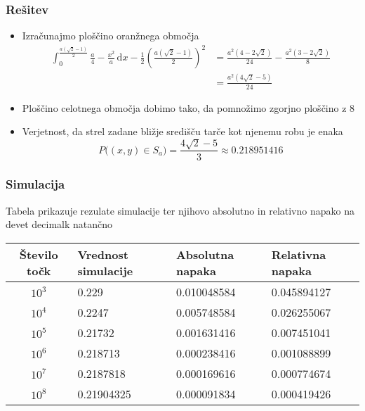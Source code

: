 \documentclass{beamer}
\begin{document}
\begin{frame}
    \frametitle{Rešitev}
\begin{itemize}
\item Izračunajmo ploščino oranžnega območja
\begin{align*}
    \int_{0}^{\frac{a(\sqrt{2}-1)}{2}} \frac{a}{4} - \frac{x^2}{a} \, \mathrm{d}x - \frac{1}{2}(\frac{a(\sqrt{2}-1)}{2})^2
    &= \frac{a^2(4-2\sqrt{2})}{24} - \frac{a^2(3-2\sqrt{2})}{8} \\
    &= \frac{a^2(4\sqrt{2}-5)}{24}
\end{align*}
\item Ploščino celotnega območja dobimo tako, da pomnožimo zgorjno ploščino z $8$
\item Verjetnost, da strel zadane bližje središču tarče kot njenemu robu je enaka
\begin{equation*}
    P\big((x,y) \in S_a\big) = \frac{4\sqrt{2}-5}{3} \approx 0.218951416
\end{equation*}
\end{itemize}
\end{frame}

\begin{frame}
    \frametitle{Simulacija}
    Tabela prikazuje rezulate simulacije ter njihovo absolutno in relativno
    napako na devet decimalk natančno
    \begin{table}[!ht]
        \footnotesize
        \begin{tabular}{|c|l|l|l|}
        \hline
        \textbf{Število točk} & \textbf{Vrednost simulacije} & \textbf{Absolutna napaka} & \textbf{Relativna napaka} \\ \hline
        $10^3$                & 0.229                        & 0.010048584               & 0.045894127               \\ \hline
        $10^4$                & 0.2247                       & 0.005748584               & 0.026255067               \\ \hline
        $10^5$                & 0.21732                      & 0.001631416               & 0.007451041               \\ \hline
        $10^6$                & 0.218713                     & 0.000238416               & 0.001088899               \\ \hline
        $10^7$                & 0.2187818                    & 0.000169616               & 0.000774674               \\ \hline
        $10^8$                & 0.21904325                   & 0.000091834               & 0.000419426               \\ \hline
        \end{tabular}
        \end{table}
\end{frame}
\end{document}
